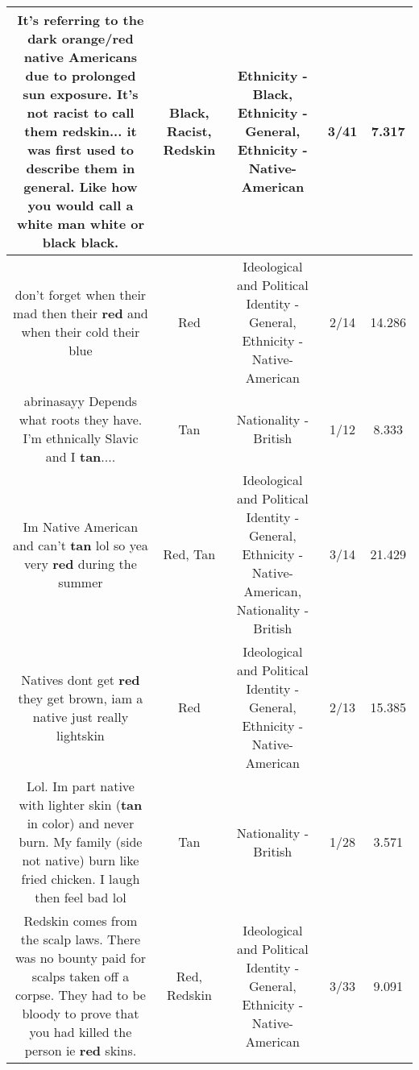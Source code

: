\documentclass[11pt]{article}
\newlength\mylength
\begin{document}
\begin{center}
\begin{longtable}{|C{.65\mylength}|C{.30\mylength}|C{.12\mylength}|C{.12\mylength}|C{.12\mylength}|}
  \small It's referring to the dark orange/red native Americans due to prolonged sun exposure. It's not \textbf{racist} to call them \textbf{redskin}... it was first used to describe them in general. Like how you would call a white man white or \textbf{black} \textbf{black}.\normalsize   & Black, Racist, Redskin & Ethnicity - Black, Ethnicity - General, Ethnicity - Native-American & 3/41 & 7.317 \\  \hline
  \small don't forget when their mad then their \textbf{r\textbf{ed}} and when their cold their blue\normalsize   & Red &  Ideological and Political Identity - General, Ethnicity - Native-American & 2/14 & 14.286 \\  \hline
  \small abrinasayy Depends what roots they have.   I'm ethnically Slavic and I \textbf{tan}....\normalsize   & Tan & Nationality - British & 1/12 & 8.333 \\  \hline
  \small Im Native American and can't \textbf{tan} lol so yea very \textbf{r\textbf{ed}} during the summer\normalsize   & Red, Tan &  Ideological and Political Identity - General, Ethnicity - Native-American, Nationality - British & 3/14 & 21.429 \\  \hline
  \small Natives dont get \textbf{r\textbf{ed}} they get brown, iam a native just really lightskin\normalsize   & Red &  Ideological and Political Identity - General, Ethnicity - Native-American & 2/13 & 15.385 \\  \hline
  \small Lol. Im part native with lighter skin (\textbf{tan} in color) and never burn. My family (side not native) burn like fried chicken. I laugh then feel bad lol\normalsize   & Tan & Nationality - British & 1/28 & 3.571 \\  \hline
  \small Redskin comes from the scalp laws. There was no bounty paid for scalps taken off a corpse.  They had to be bloody to prove that you had killed the person ie \textbf{r\textbf{ed}} skins.\normalsize   & Red, Redskin &  Ideological and Political Identity - General, Ethnicity - Native-American & 3/33 & 9.091 \\  \hline

\end{longtable}
\end{center}
\end{document}
